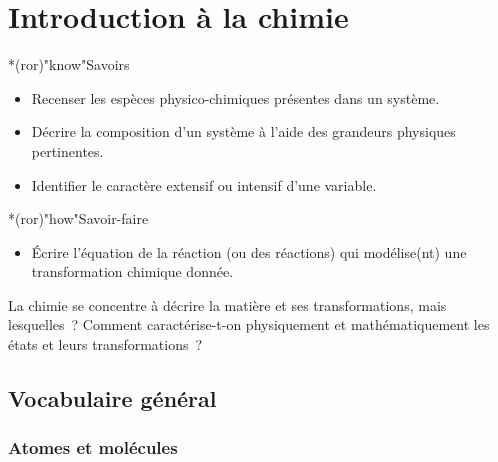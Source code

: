 \documentclass[../../main/main.tex]{subfiles}
\begin{document}
\setcounter{chapter}{0}

\chapter{Introduction \`a la chimie}

\vfill

\begin{prgm}
	\begin{tcb}*(ror)"know"{Savoirs}
		\begin{itemize}[label=$\diamond$, leftmargin=10pt]
			\item Recenser les espèces physico-chimiques présentes
			      dans un système.
			\item Décrire la composition d’un système à l’aide des grandeurs physiques
			      pertinentes.
			\item Identifier le caractère extensif ou intensif d’une
			      variable.
		\end{itemize}
	\end{tcb}

	\begin{tcb}*(ror)"how"{Savoir-faire}
		\begin{itemize}[label=$\diamond$, leftmargin=10pt]
			\item Écrire l’équation de la réaction (ou des réactions) qui modélise(nt)
			      une transformation chimique donnée.
		\end{itemize}
	\end{tcb}
\end{prgm}

\vfill
\minitoc
\vfill

\newpage

La chimie se concentre à décrire la matière et ses transformations, mais
lesquelles~? Comment caractérise-t-on physiquement et mathématiquement les états
et leurs transformations~?

\section{Vocabulaire général}
\subsection{Atomes et molécules}
\end{document}
